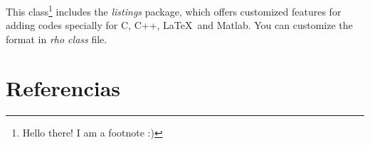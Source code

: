 \documentclass[9pt,letterpaper,onecolumn]{rho-class/rho}
\begin{document}
    This class\footnote{Hello there! I am a footnote :)} includes the \textit{listings} package, which offers customized features for adding codes specially for C, C++, \LaTeX\ and Matlab. You can customize the format in \textit{rho class} file.

    

    
        

\section{Referencias}


\end{document}

